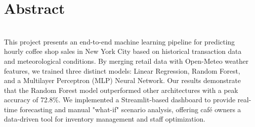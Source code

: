 %
\chapter*{Abstract}
\label{sec:abstract}
\vspace*{-10mm}
\\

This project presents an end-to-end machine learning pipeline for predicting hourly coffee shop sales in New York City based on historical transaction data and meteorological conditions. By merging retail data with Open-Meteo weather features, we trained three distinct models: Linear Regression, Random Forest, and a Multilayer Perceptron (MLP) Neural Network. Our results demonstrate that the Random Forest model outperformed other architectures with a peak accuracy of 72.8\%. We implemented a Streamlit-based dashboard to provide real-time forecasting and manual "what-if" scenario analysis, offering café owners a data-driven tool for inventory management and staff optimization.

\vspace*{20mm}
